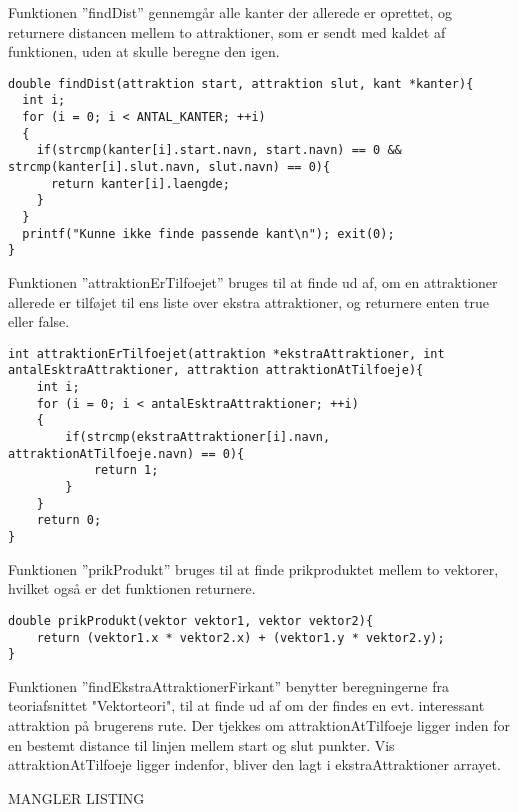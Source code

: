 Funktionen ”findDist” gennemgår alle kanter der allerede er oprettet, og returnere distancen mellem to attraktioner, som er sendt med kaldet af funktionen, uden at skulle beregne den igen.

\begin{lstlisting}
double findDist(attraktion start, attraktion slut, kant *kanter){
  int i;
  for (i = 0; i < ANTAL_KANTER; ++i)
  {
    if(strcmp(kanter[i].start.navn, start.navn) == 0 && strcmp(kanter[i].slut.navn, slut.navn) == 0){
      return kanter[i].laengde;
    }
  }
  printf("Kunne ikke finde passende kant\n"); exit(0);
}
\end{lstlisting}

Funktionen ”attraktionErTilfoejet” bruges til at finde ud af, om en attraktioner allerede er tilføjet til ens liste over ekstra attraktioner, og returnere enten true eller false.

\begin{lstlisting}
int attraktionErTilfoejet(attraktion *ekstraAttraktioner, int antalEsktraAttraktioner, attraktion attraktionAtTilfoeje){
	int i;
	for (i = 0; i < antalEsktraAttraktioner; ++i)
	{
		if(strcmp(ekstraAttraktioner[i].navn, attraktionAtTilfoeje.navn) == 0){
			return 1;
		}
	}
	return 0;
}
\end{lstlisting}

Funktionen ”prikProdukt” bruges til at finde prikproduktet mellem to vektorer, hvilket også er det funktionen returnere.

\begin{lstlisting}
double prikProdukt(vektor vektor1, vektor vektor2){
	return (vektor1.x * vektor2.x) + (vektor1.y * vektor2.y);
}
\end{lstlisting}

Funktionen ”findEkstraAttraktionerFirkant” benytter beregningerne fra teoriafsnittet "Vektorteori", til at finde ud af om der findes en evt. interessant attraktion på brugerens rute. Der tjekkes om attraktionAtTilfoeje ligger inden for en bestemt distance til linjen mellem start og slut punkter. Vis attraktionAtTilfoeje ligger indenfor, bliver den lagt i ekstraAttraktioner arrayet.

MANGLER LISTING

